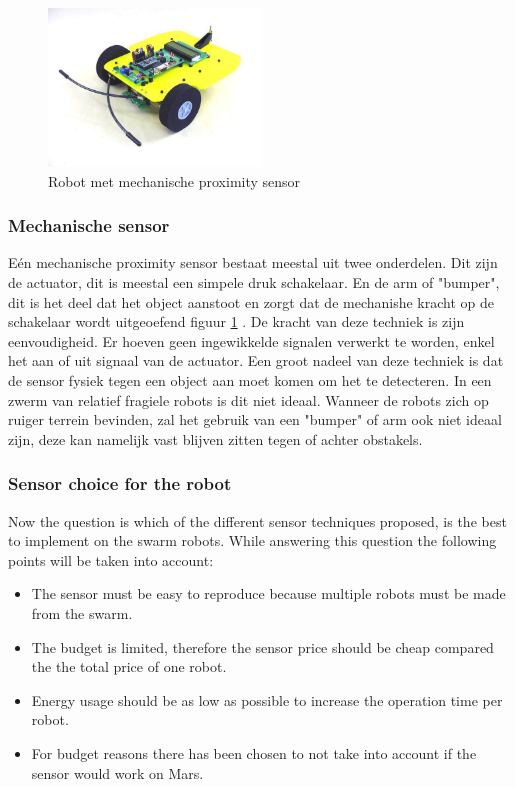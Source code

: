 \documentclass[10pt,a4paper]{article}
\begin{document}
\begin{figure}[!ht]

  \centering
      \includegraphics[width=0.5\textwidth]{voelsprieten.jpg}
  \caption{Robot met mechanische proximity sensor}  \label{voelspriet}
 
\end{figure}

\subsubsection{Mechanische sensor}
Eén mechanische proximity sensor bestaat meestal uit twee onderdelen. Dit zijn de actuator, dit is meestal een simpele druk schakelaar. En de arm of "bumper", dit is het deel dat het object aanstoot en zorgt dat de mechanishe kracht op de schakelaar wordt uitgeoefend figuur \ref{voelspriet} . De kracht van deze techniek is zijn eenvoudigheid. Er hoeven geen ingewikkelde signalen verwerkt te worden, enkel het aan of uit signaal van de actuator. Een groot nadeel van deze techniek is dat de sensor fysiek tegen een object aan moet komen om het te detecteren. In een zwerm van relatief fragiele robots is dit niet ideaal. Wanneer de robots zich op ruiger terrein bevinden, zal het gebruik van een "bumper" of arm ook niet ideaal zijn, deze kan namelijk vast blijven zitten tegen of achter obstakels.



\subsubsection{Sensor choice for the robot}
Now the question is which of the different sensor techniques proposed, is the best to implement on the swarm robots. While answering this question the following points will be taken into account:

\begin{itemize}
    \item The sensor must be easy to reproduce because multiple robots must be made from the swarm.
    \item The budget is limited, therefore the sensor price should be cheap compared the the total price of one robot.
    \item Energy usage should be as low as possible to increase the operation time per robot.
    \item For budget reasons there has been chosen to not take into account if the sensor would work on Mars.
\end{itemize}
\end{document}
